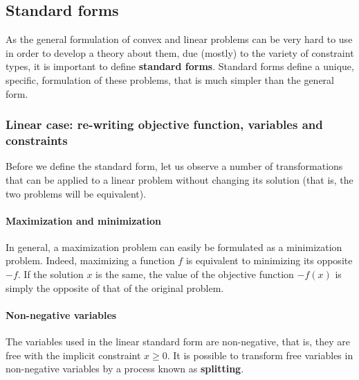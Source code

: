 \subsection{Standard forms}
As the general formulation of convex and linear problems can be very hard to use in order to develop a theory about them, due (mostly) to the variety of constraint types, it is important to define \textbf{standard forms}. Standard forms define a unique, specific, formulation of these problems, that is much simpler than the general form.

\subsubsection{Linear case: re-writing objective function, variables and constraints}
Before we define the standard form, let us observe a number of transformations that can be applied to a linear problem without changing its solution (that is, the two problems will be equivalent).

\paragraph{Maximization and minimization}
In general, a maximization problem can easily be formulated as a minimization problem. Indeed, maximizing a function $f$ is equivalent to minimizing its opposite $-f$. If the solution $x$ is the same, the value of the objective function $-f(x)$ is simply the opposite of that of the original problem.

\begin{center}
\end{center}

\paragraph{Non-negative variables}
The variables used in the linear standard form are non-negative, that is, they are free with the implicit constraint $x \geq 0$. It is possible to transform free variables in non-negative variables by a process known as \textbf{splitting}.

